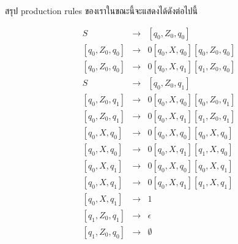 \par{
สรุป production rules ของเราในขณะนี้จะแสดงได้ดังต่อไปนี้

\begin{eqnarray*}
S & \rightarrow & [q_0,Z_0, q_0] \\
\left[q_0, Z_0, q_0\right]& \rightarrow & 0 [ q_0, X, q_0][q_0, Z_0, q_0] \\
\left[q_0, Z_0, q_0\right] & \rightarrow & 0 [ q_0, X, q_1][q_1, Z_0, q_0] \\
%
S & \rightarrow & [q_0,Z_0, q_1] \\
\left[q_0, Z_0, q_1\right] & \rightarrow & 0 [ q_0, X, q_0][q_0, Z_0, q_1] \\
\left[q_0, Z_0, q_1\right] & \rightarrow & 0 [ q_0, X, q_1][q_1, Z_0, q_1] \\
%
\left[q_0, X, q_0\right] & \rightarrow & 0[q_0, X, q_0][q_0, X, q_0] \\
\left[q_0, X, q_0\right] & \rightarrow & 0[q_0, X, q_1][q_1, X, q_0] \\
\left[q_0, X, q_1\right] & \rightarrow & 0[q_0, X, q_0][q_0, X, q_1] \\
\left[q_0, X, q_1\right] & \rightarrow & 0[q_0, X, q_1][q_1, X, q_1] \\
%
\left[q_0, X, q_1\right] & \rightarrow & 1 \\
\left[q_1, Z_0, q_1\right] & \rightarrow & \epsilon \\
\left[q_1, Z_0, q_0\right] & \rightarrow & \emptyset
\end{eqnarray*}
}

